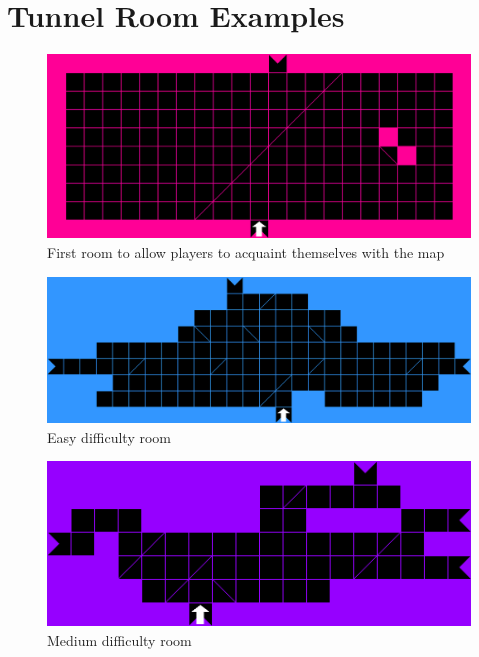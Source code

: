 \documentclass{scrreprt}
\begin{document}
	\appendix
	
	\chapter{Tunnel Room Examples}\label{chp:rooms}
		\begin{figure}[!ht]
			\centering
			\includegraphics[width=\columnwidth]{start}
			\caption{First room to allow players to acquaint themselves with the map}
			\label{fig:start}
		\end{figure}
	
		\begin{figure}[!ht]
			\centering
			\includegraphics[width=\columnwidth]{easy}
			\caption{Easy difficulty room}
			\label{fig:easy}
		\end{figure}
	
		\begin{figure}[!ht]
			\centering
			\includegraphics[width=\columnwidth]{medium}
			\caption{Medium difficulty room}
			\label{fig:medium}
		\end{figure}
	
\end{document}
